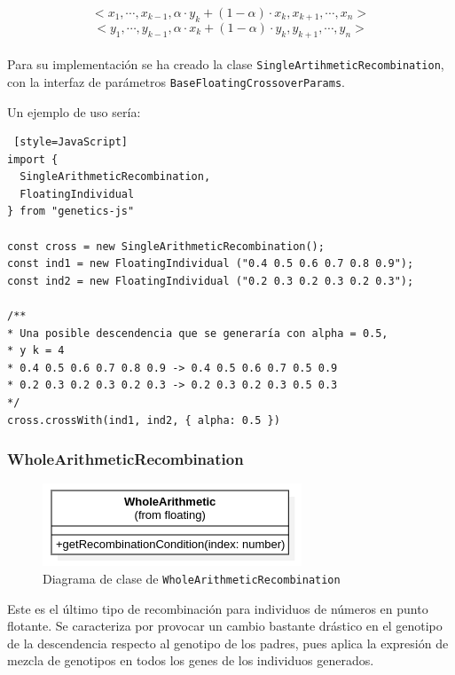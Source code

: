 \begin{equation}
    <x_1, \cdots ,x_{k−1}, \alpha \cdot y_k + (1 - \alpha) \cdot x_k, x_{k+1}, \cdots ,x_n >
\end{equation}
\begin{equation}
    <y_1, \cdots ,y_{k−1}, \alpha \cdot x_k + (1 - \alpha) \cdot y_k, y_{k+1}, \cdots ,y_n >
\end{equation}
\\
Para su implementación se ha creado la clase \texttt{SingleArtihmeticRecombination}, con la interfaz de parámetros \texttt{BaseFloatingCrossoverParams}. \\

\clearpage

Un ejemplo de uso sería: \\

\begin{lstlisting} [style=JavaScript]
import { 
  SingleArithmeticRecombination, 
  FloatingIndividual 
} from "genetics-js"

const cross = new SingleArithmeticRecombination();
const ind1 = new FloatingIndividual ("0.4 0.5 0.6 0.7 0.8 0.9");
const ind2 = new FloatingIndividual ("0.2 0.3 0.2 0.3 0.2 0.3");

/**
* Una posible descendencia que se generaría con alpha = 0.5,
* y k = 4
* 0.4 0.5 0.6 0.7 0.8 0.9 -> 0.4 0.5 0.6 0.7 0.5 0.9
* 0.2 0.3 0.2 0.3 0.2 0.3 -> 0.2 0.3 0.2 0.3 0.5 0.3
*/
cross.crossWith(ind1, ind2, { alpha: 0.5 })
\end{lstlisting}

\subsubsection{WholeArithmeticRecombination}

\begin{figure}[ht]
    \centering
    \includegraphics[scale=0.7]{mem/images/cap-4/4.2.6(Crossover)/WholeArithmetic.png}
    \caption{Diagrama de clase de \texttt{WholeArithmeticRecombination}}
    \label{fig:my_label}
\end{figure}

Este es el último tipo de recombinación para individuos de números en punto flotante. Se caracteriza por provocar un cambio bastante drástico en el genotipo de la descendencia respecto al genotipo de los padres, pues aplica la expresión de mezcla de genotipos en todos los genes de los individuos generados. \\

